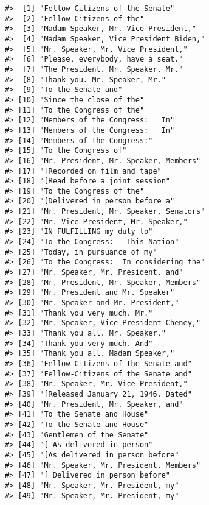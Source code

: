 \documentclass[]{book}
\begin{document}
\begin{verbatim}
#>  [1] "Fellow-Citizens of the Senate"            
#>  [2] "Fellow Citizens of the"                   
#>  [3] "Madam Speaker, Mr. Vice President,"       
#>  [4] "Madam Speaker, Vice President Biden,"     
#>  [5] "Mr. Speaker, Mr. Vice President,"         
#>  [6] "Please, everybody, have a seat."          
#>  [7] "The President. Mr. Speaker, Mr."          
#>  [8] "Thank you. Mr. Speaker, Mr."              
#>  [9] "To the Senate and"                        
#> [10] "Since the close of the"                   
#> [11] "To the Congress of the"                   
#> [12] "Members of the Congress:   In"            
#> [13] "Members of the Congress:   In"            
#> [14] "Members of the Congress:"                 
#> [15] "To the Congress of"                       
#> [16] "Mr. President, Mr. Speaker, Members"      
#> [17] "[Recorded on film and tape"               
#> [18] "[Read before a joint session"             
#> [19] "To the Congress of the"                   
#> [20] "[Delivered in person before a"            
#> [21] "Mr. President, Mr. Speaker, Senators"     
#> [22] "Mr. Vice President, Mr. Speaker,"         
#> [23] "IN FULFILLING my duty to"                 
#> [24] "To the Congress:   This Nation"           
#> [25] "Today, in pursuance of my"                
#> [26] "To the Congress:  In considering the"     
#> [27] "Mr. Speaker, Mr. President, and"          
#> [28] "Mr. President, Mr. Speaker, Members"      
#> [29] "Mr. President and Mr. Speaker"            
#> [30] "Mr. Speaker and Mr. President,"           
#> [31] "Thank you very much. Mr."                 
#> [32] "Mr. Speaker, Vice President Cheney,"      
#> [33] "Thank you all. Mr. Speaker,"              
#> [34] "Thank you very much. And"                 
#> [35] "Thank you all. Madam Speaker,"            
#> [36] "Fellow-Citizens of the Senate and"        
#> [37] "Fellow-Citizens of the Senate and"        
#> [38] "Mr. Speaker, Mr. Vice President,"         
#> [39] "[Released January 21, 1946. Dated"        
#> [40] "Mr. President, Mr. Speaker, and"          
#> [41] "To the Senate and House"                  
#> [42] "To the Senate and House"                  
#> [43] "Gentlemen of the Senate"                  
#> [44] "[ As delivered in person"                 
#> [45] "[As delivered in person before"           
#> [46] "Mr. Speaker, Mr. President, Members"      
#> [47] "[ Delivered in person before"             
#> [48] "Mr. Speaker, Mr. President, my"           
#> [49] "Mr. Speaker, Mr. President, my"           

\end{verbatim}
\end{document}
